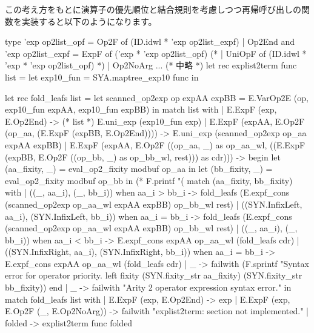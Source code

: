 \documentclass[mingoth,a4paper]{jsarticle}
\begin{document}

この考え方をもとに演算子の優先順位と結合規則を考慮しつつ再帰呼び出しの関数を実装すると以下のようになります。


\begin{commandline}
  type 'exp op2list_opf =
      Op2F of (ID.idwl * 'exp op2list_expf)
    | Op2End
  and 'exp op2list_expf =
      ExpF of ('exp * 'exp op2list_opf)
(*     | UniOpF of (ID.idwl * 'exp * 'exp op2list_opf) *)
    | Op2NoArg
  ... (* 中略 *)
  let rec explist2term func list =
    let exp10_fun = SYA.maptree_exp10 func in

    let rec fold_leafs list =
      let scanned_op2exp op expAA expBB =
        E.VarOp2E (op,
                   exp10_fun expAA,
                   exp10_fun expBB) in
        match list with
          | E.ExpF (exp, E.Op2End) -> (* list *)
              E.uni_exp (exp10_fun exp)
          | E.ExpF (expAA, E.Op2F (op_aa,
                                   (E.ExpF (expBB, E.Op2End)))) ->
              E.uni_exp (scanned_op2exp op_aa expAA expBB)
          | E.ExpF (expAA, E.Op2F ((op_aa, _) as op_aa_wl,
                                   ((E.ExpF (expBB, E.Op2F ((op_bb, _) as op_bb_wl, rest))) as cdr))) ->
              begin
                let (aa_fixity, _) = eval_op2_fixity modbuf op_aa in
                let (bb_fixity, _) = eval_op2_fixity modbuf op_bb in
                  (* F.printf "(%
                  match (aa_fixity, bb_fixity) with
                    | ((_, aa_i), (_, bb_i)) when aa_i > bb_i ->
                        fold_leafs (E.expf_cons (scanned_op2exp op_aa_wl expAA expBB) op_bb_wl rest)
                    | ((SYN.InfixLeft, aa_i), (SYN.InfixLeft, bb_i)) when aa_i = bb_i ->
                        fold_leafs (E.expf_cons (scanned_op2exp op_aa_wl expAA expBB) op_bb_wl rest)
                    | ((_, aa_i), (_, bb_i)) when aa_i < bb_i ->
                        E.expf_cons expAA op_aa_wl (fold_leafs cdr)
                    | ((SYN.InfixRight, aa_i), (SYN.InfixRight, bb_i)) when aa_i = bb_i ->
                        E.expf_cons expAA op_aa_wl (fold_leafs cdr)
                    | _ ->
                        failwith (F.sprintf "Syntax error for operator priority. left fixity %
                                    (SYN.fixity_str aa_fixity)
                                    (SYN.fixity_str bb_fixity))
              end
          | _ -> failwith "Arity 2 operator expression syntax error."
    in
      match fold_leafs list with
        | E.ExpF (exp, E.Op2End) -> exp
        | E.ExpF (exp, E.Op2F (_, E.Op2NoArg)) -> failwith "explist2term: section not implemented."
        | folded -> explist2term func folded
\end{commandline}
\end{document}
